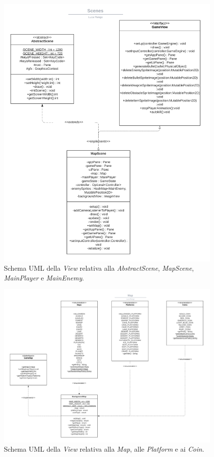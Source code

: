 \begin{figure}[H]
	\centering{} %
	\includegraphics[width=1\textwidth]{./img/scenes_uml.png} 
	\caption{Schema UML della \emph{View} relativa alla \emph{AbstractScene}, \emph{MapScene}, \emph{MainPlayer} e \emph{MainEnemy}.}
	\label{img:scenes_uml}
\end{figure}

\begin{figure}[H]
	\centering{}
	\includegraphics[width=1.3\textwidth]{./img/map_uml.png} 
	\caption{Schema UML della \emph{View} relativa alla \emph{Map}, alle \emph{Platform} e ai \emph{Coin}.}
	\label{img:map_uml}
\end{figure}

